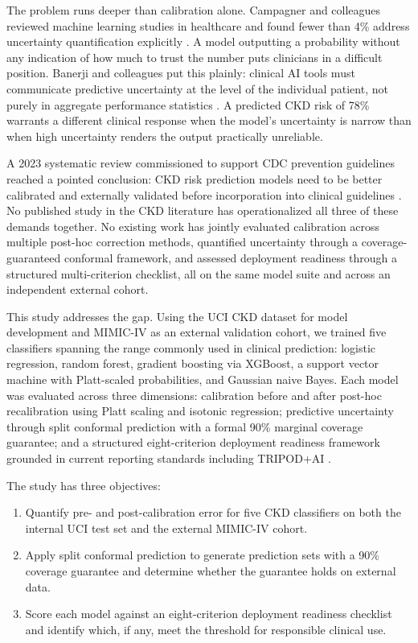 The problem runs deeper than calibration alone. Campagner and colleagues
reviewed machine learning studies in healthcare and found fewer than 4\% address
uncertainty quantification explicitly \citep{Campagner2025}. A model outputting
a probability without any indication of how much to trust the number puts
clinicians in a difficult position. Banerji and colleagues put this plainly:
clinical AI tools must communicate predictive uncertainty at the level of the
individual patient, not purely in aggregate performance statistics
\citep{Banerji2023}. A predicted CKD risk of 78\% warrants a different clinical
response when the model's uncertainty is narrow than when high uncertainty
renders the output practically unreliable.

A 2023 systematic review commissioned to support CDC prevention guidelines
reached a pointed conclusion: CKD risk prediction models need to be better
calibrated and externally validated before incorporation into clinical guidelines
\citep{GonzalezRocha2023}. No published study in the CKD literature has
operationalized all three of these demands together. No existing work has jointly
evaluated calibration across multiple post-hoc correction methods, quantified
uncertainty through a coverage-guaranteed conformal framework, and assessed
deployment readiness through a structured multi-criterion checklist, all on the
same model suite and across an independent external cohort.

This study addresses the gap. Using the UCI CKD dataset for model development
and MIMIC-IV as an external validation cohort, we trained five classifiers
spanning the range commonly used in clinical prediction: logistic regression,
random forest, gradient boosting via XGBoost, a support vector machine with
Platt-scaled probabilities, and Gaussian naive Bayes. Each model was evaluated
across three dimensions: calibration before and after post-hoc recalibration
using Platt scaling and isotonic regression; predictive uncertainty through split
conformal prediction with a formal 90\% marginal coverage guarantee; and a
structured eight-criterion deployment readiness framework grounded in current
reporting standards including TRIPOD+AI \citep{Collins2024TRIPOD}.

The study has three objectives:
\begin{enumerate}
    \item Quantify pre- and post-calibration error for five CKD classifiers on
          both the internal UCI test set and the external MIMIC-IV cohort.
    \item Apply split conformal prediction to generate prediction sets with a
          90\% coverage guarantee and determine whether the guarantee holds on
          external data.
    \item Score each model against an eight-criterion deployment readiness
          checklist and identify which, if any, meet the threshold for
          responsible clinical use.
\end{enumerate}

